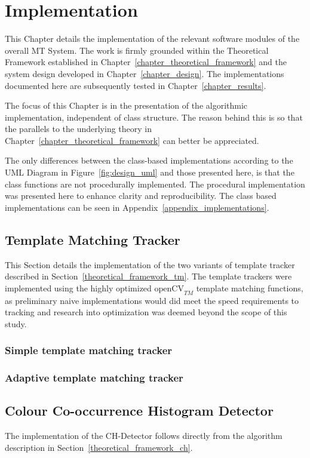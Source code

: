 \chapter{Implementation}\label{chapter_implementation}
This Chapter details the implementation of the relevant software modules of the
overall MT System. The work is firmly grounded within the Theoretical Framework
established in Chapter~\ref{chapter_theoretical_framework} and the system design
developed in Chapter~\ref{chapter_design}. The implementations documented here
are subsequently tested in Chapter~\ref{chapter_results}.

The focus of this Chapter is in the presentation of the algorithmic
implementation, independent of class structure. The reason behind this is so
that the parallels to the underlying theory in
Chapter~\ref{chapter_theoretical_framework} can better be appreciated.

The only differences between the class-based implementations according to the
UML Diagram in Figure~\ref{fig:design_uml} and those presented here, is that the
class functions are not procedurally implemented. The procedural implementation
was presented here to enhance clarity and reproducibility. The class based
implementations can be seen in Appendix~\ref{appendix_implementations}.

\section{Template Matching Tracker}\label{implementation_tm}
This Section details the implementation of the two variants of template tracker
described in Section~\ref{theoretical_framework_tm}. The template trackers were
implemented using the highly optimized $\text{openCV}_{TM}$ template matching
functions, as preliminary naive implementations would did meet the speed requirements to
tracking and research into optimization was deemed beyond the scope of this
study.

\subsection{Simple template matching tracker}

\subsection{Adaptive template matching tracker}


\section{Colour Co-occurrence Histogram Detector}\label{implementation_ch}
The implementation of the CH-Detector follows directly from the algorithm
description in Section~\ref{theoretical_framework_ch}.

